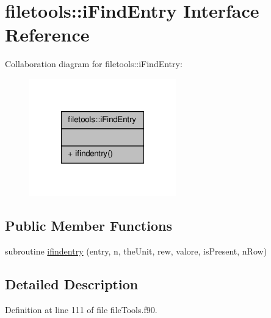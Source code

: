\hypertarget{interfacefiletools_1_1i_find_entry}{\section{filetools\-:\-:i\-Find\-Entry Interface Reference}
\label{interfacefiletools_1_1i_find_entry}
}


Collaboration diagram for filetools\-:\-:i\-Find\-Entry\-:\nopagebreak
\begin{figure}[H]
\begin{center}
\leavevmode
\includegraphics[width=180pt]{interfacefiletools_1_1i_find_entry__coll__graph}
\end{center}
\end{figure}
\subsection*{Public Member Functions}
\begin{DoxyCompactItemize}
\item 
subroutine \hyperlink{interfacefiletools_1_1i_find_entry_acc5d0e736fc0e81737c4ae294410f3c8}{ifindentry} (entry, n, the\-Unit, rew, valore, is\-Present, n\-Row)
\end{DoxyCompactItemize}


\subsection{Detailed Description}


Definition at line 111 of file file\-Tools.\-f90.



